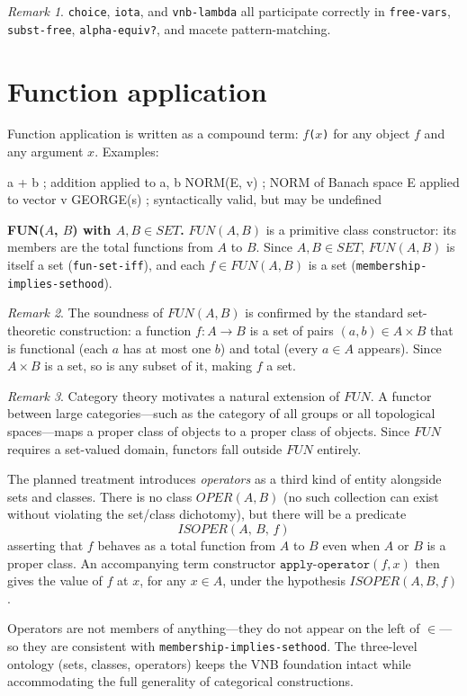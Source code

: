 \documentclass{amsbook}[openany]
\theoremstyle{definition}
\theoremstyle{remark}
\newtheorem{remark}{Remark}[chapter]
\theoremstyle{remark}
\begin{document}
\begin{remark}
\texttt{choice}, \texttt{iota}, and \texttt{vnb-lambda} all participate
correctly in \texttt{free-vars}, \texttt{subst-free}, \texttt{alpha-equiv?},
and macete pattern-matching.
\end{remark}

\section{Function application}
\label{sec:funapp}

Function application is written as a compound term: \texttt{$f$($x$)} for
any object $f$ and any argument $x$.  Examples:
\begin{VNBsnip}
a + b               ; addition applied to a, b
NORM(E, v)          ; NORM of Banach space E applied to vector v
GEORGE(s)           ; syntactically valid, but may be undefined
\end{VNBsnip}

\textbf{FUN($A$, $B$) with $A, B \in \mathit{SET}$.}
$\mathit{FUN}(A, B)$ is a primitive class constructor: its members are
the total functions from $A$ to $B$.  Since $A, B \in \mathit{SET}$,
$\mathit{FUN}(A,B)$ is itself a set (\texttt{fun-set-iff}), and each
$f \in \mathit{FUN}(A,B)$ is a set (\texttt{membership-implies-sethood}).

\begin{remark}
The soundness of $\mathit{FUN}(A,B)$ is confirmed by the standard
set-theoretic construction: a function $f : A \to B$ is a set of pairs
$(a, b) \in A \times B$ that is functional (each $a$ has at most one $b$)
and total (every $a \in A$ appears).  Since $A \times B$ is a set, so
is any subset of it, making $f$ a set.
\end{remark}


\begin{remark}
Category theory motivates a natural extension of $\mathit{FUN}$.  A
functor between large categories---such as the category of all groups or
all topological spaces---maps a proper class of objects to a proper class
of objects.  Since $\mathit{FUN}$ requires a set-valued domain, functors
fall outside $\mathit{FUN}$ entirely.

The planned treatment introduces \emph{operators} as a third kind of
entity alongside sets and classes.  There is no class $\mathit{OPER}(A,B)$
(no such collection can exist without violating the set/class dichotomy),
but there will be a predicate
\[
  \mathit{ISOPER}(A,\, B,\, f)
\]
asserting that $f$ behaves as a total function from $A$ to $B$ even when
$A$ or $B$ is a proper class.  An accompanying term constructor
$\texttt{apply-operator}(f, x)$ then gives the value of $f$ at $x$, for
any $x \in A$, under the hypothesis $\mathit{ISOPER}(A,B,f)$.

Operators are not members of anything---they do not appear on the left of
$\in$---so they are consistent with
\texttt{membership-implies-sethood}.  The three-level ontology (sets,
classes, operators) keeps the VNB foundation intact while accommodating
the full generality of categorical constructions.
\end{remark}
\end{document}
